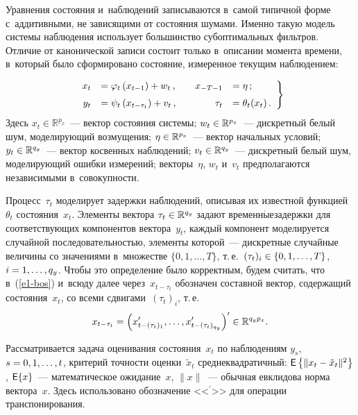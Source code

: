\begin{multicols}{2}
     Уравнения состояния и~наблюдений записываются в~самой ти\-пич\-ной 
форме с~аддитивными, не зависящими от со\-сто\-яния шумами. Именно такую 
модель сис\-те\-мы наблюдения использует большинство субоптимальных 
фильт\-ров. Отличие от канонической записи со\-сто\-ит только в~описании 
момента времени, в~который было сформировано со\-сто\-яние, измеренное 
текущим наблюде\-нием:
{

}


\vspace*{8pt}

\noindent
     \begin{equation}
     \left.
     \begin{array}{rlrl}
     x_t&= \varphi_t\left(x_{t-1}\right)+w_t\,, &\quad x_{-T-1} &=\eta\,;\\[6pt]
     y_t &= \psi_t\left(x_{t-\tau_t}\right) +v_t\,,&\enskip \tau_t&=\theta_t(x_t)\,.
     \end{array}
     \right\}
     \label{e1-bos}
     \end{equation}
     Здесь $x_t\in \mathbb{R}^{p_x}$~--- век\-тор со\-сто\-яния сис\-те\-мы; 
$w_t\hm\in \mathbb{R}^{p_x}$~--- дискретный белый шум, мо\-де\-ли\-ру\-ющий 
возмущения; $\eta\hm\in \mathbb{R}^{p_x}$~--- век\-тор начальных усло\-вий; 
$y_t\hm\in \mathbb{R}^{q_y}$~--- век\-тор косвенных наблюдений; $v_t\hm\in 
\mathbb{R}^{q_y}$~--- дискретный белый шум, мо\-де\-ли\-ру\-ющий ошиб\-ки 
измерений; век\-то\-ры~$\eta$, $w_t$ и~$v_t$ предполагаются независимыми 
в~со\-во\-куп\-ности.
     
     Процесс~$\tau_t$ моделирует за\-держ\-ки наблюдений, описывая их 
известной функцией~$\theta_t$ со\-сто\-яния~$x_t$. Элементы вектора 
$\tau_t\hm\in \mathbb{R}^{q_y}$ задают временн$\acute{\mbox{ы}}$е\linebreak за\-держ\-ки для 
со\-от\-вет\-ст\-ву\-ющих компонентов вектора~$y_t$, каж\-дый компонент 
моделируется случайной по\-сле\-до\-ва\-тель\-ностью, элементы которой~--- 
дискретные случайные величины со значениями в~множестве $\{0,1,\ldots , 
T\}$, т.\,е.\ $(\tau_t)_i\hm\in \{0,1,\ldots, T\}$, $i\hm=1,\ldots , q_y$. Чтобы это 
определение было корректным, будем считать, что в~(\ref{e1-bos}) и~всюду 
далее через~$x_{t-\tau_t}$ обозначен со\-став\-ной век\-тор, содержащий 
со\-сто\-яния~$x_t$, со всеми сдвигами~$(\tau_t)_i$, т.\,е.\ 
$$
x_{t-\tau_t}\hm= 
\left( x^\prime_{t-(\tau_t)_1}, \ldots , x^\prime_{t-(\tau_t)_{q_y}}\right)^\prime 
\hm\in \mathbb{R}^{q_y p_x}.
$$
     
     Рассматривается задача оценивания со\-сто\-яния~$x_t$ по наблюдениям 
$y_s$, $s\hm= 0,1,\ldots , t$, критерий точ\-ности оцен\-ки~$\tilde{x}_t$ 
сред\-не\-квад\-ра\-тич\-ный: ${\sf E}\left\{ \| x_t\hm- \tilde{x}_t\|^2\right\}$, 
${\sf E}\{x\}$~--- математическое ожидание~$x$, $\| x\|$~--- обыч\-ная 
евклидова норма век\-то\-ра~$x$. Здесь использовано обозначение 
<<${}^\prime$>> для операции транс\-по\-ни\-ро\-ва\-ния.
     

\end{multicols}
